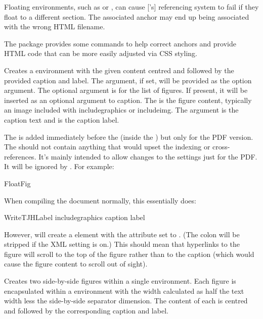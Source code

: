\documentclass[toc=listof]{scrreport}
\begin{document}
Floating environments, such as  or , can
cause ['s] referencing system to fail if they
float to a different section. The associated anchor may end up being
associated with the wrong HTML filename.

The  package provides some commands to help correct
anchors and provide HTML code that can be more easily adjusted via
CSS styling.

Creates a  environment with the given content centred
and followed by the provided caption and label. The 
argument, if set, will be provided as the  option
argument. The  optional argument is for the list of
figures. If present, it will be inserted as an optional argument to
\gls{caption}. The  is the figure content, typically
an image included with \gls{includegraphics} or \gls{includeimg}.
The  argument is the caption text and 
is the caption label.

The  is added immediately
before the  (inside the ) but only for the
PDF version.
The  should not contain anything that would
upset the indexing or cross-references. It's mainly intended to
allow changes to the  settings just for the PDF.
It will be ignored by . For example:
\begin{codebox}
\gls{FloatFig}
\end{codebox}
When compiling the document normally, this essentially does:
\begin{compactcodebox}
\gls{WriteTJHLabel}
 \gls{includegraphics}
 \gls{caption}
 \gls{label}
\end{compactcodebox}
However,  will create a  element
with the  attribute set to .
(The colon will be stripped if the XML setting is on.)
This should mean that hyperlinks to the figure will scroll to the
top of the figure rather than to the caption (which would cause the
figure content to scroll out of sight).

Creates two side-by-side figures within a single 
environment. Each figure is encapsulated within a 
environment with the width calculated as half the text width less
the side-by-side separator dimension. The content of each
 is centred and followed by the corresponding caption and label.
\end{document}

